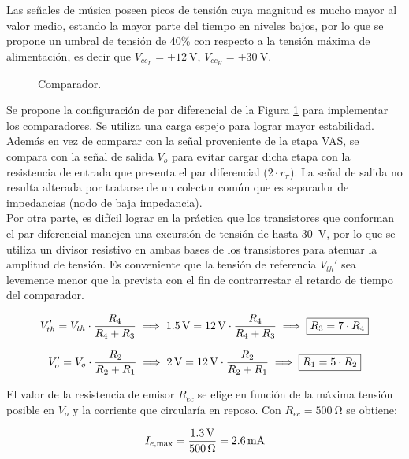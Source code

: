 	Las señales de música poseen picos de tensión cuya magnitud es mucho mayor al valor medio, estando la mayor parte del tiempo en niveles bajos, por lo que se propone un umbral de tensión de 40\% con respecto a la tensión máxima de alimentación, es decir que $V_{cc_L} = \pm \SI{12}{\volt}$, $V_{cc_H} = \pm \SI{30}{\volt}$.

	\begin{figure}[H]
		\centering
		\scalebox{0.5}{}
		\caption{Comparador.}
		\label{fig.comparador}
	\end{figure}

	Se propone la configuración de par diferencial de la Figura \ref{fig.comparador} para implementar los comparadores. Se utiliza una carga espejo para lograr mayor estabilidad. Además en vez de comparar con la señal proveniente de la etapa VAS, se compara con la señal de salida $V_{o}$ para evitar cargar dicha etapa con la resistencia de entrada que presenta el par diferencial ($2\cdot r_\pi$). La señal de salida no resulta alterada por tratarse de un colector común que es separador de impedancias (nodo de baja impedancia).\\
	\indent Por otra parte, es difícil lograr en la práctica que los transistores que conforman el par diferencial manejen una excursión de tensión de hasta \SI{30}{\volt}, por lo que se utiliza un divisor resistivo en ambas bases de los transistores para atenuar la amplitud de tensión. Es conveniente que la tensión de referencia $V_{th}'$ sea levemente menor que la prevista con el fin de contrarrestar el retardo de tiempo del comparador.

\begin{equation}
	\centering
	V_{th}' = V_{th} \cdot \frac{R_4}{R_4 + R_3} \implies \SI{1.5}{\volt} = \SI{12}{\volt} \cdot \frac{R_4}{R_4 + R_3} \implies \boxed{R_3 = 7 \cdot R_4}
\end{equation}

\begin{equation}
	\centering
	V_o' = V_o \cdot \frac{R_2}{R_2 + R_1} \implies \SI{2}{\volt} = \SI{12}{\volt} \cdot \frac{R_2}{R_2 + R_1} \implies \boxed{R_1 = 5 \cdot R_2}
	\end{equation}

	El valor de la resistencia de emisor $R_{ec}$ se elige en función de la máxima tensión posible en $V_o$ y la corriente que circularía en reposo. Con $R_{ec} = \SI{500}{\ohm}$ se obtiene:

	\begin{equation}
		\centering
		I_{e,\max} = \frac{ \SI{1.3}{\volt} }{ \SI{500}{\ohm} } = \SI{2.6}{\milli\ampere}
	\end{equation}

